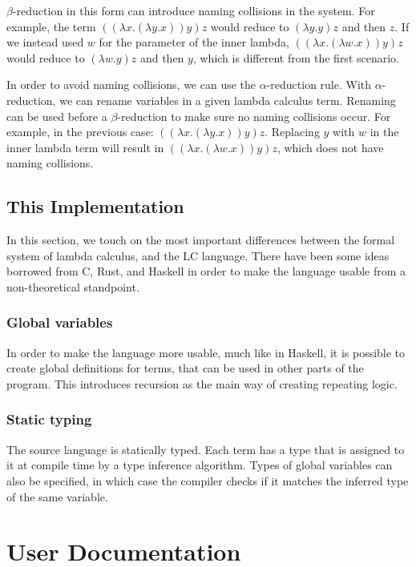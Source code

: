 \documentclass[12pt]{article}
\begin{document}
$\beta$-reduction in this form can introduce naming collisions in the system.
For example, the term $((\lambda x. (\lambda y. x)) y) z$ would reduce to
$(\lambda y. y) z$ and then $z$. If we instead used $w$ for the parameter of the
inner lambda, $((\lambda x. (\lambda w. x)) y) z$ would reduce to $(\lambda w.
y) z$ and then $y$, which is different from the first scenario.

In order to avoid naming collisions, we can use the $\alpha$-reduction rule.
With $\alpha$-reduction, we can rename variables in a given lambda calculus
term. Renaming can be used before a $\beta$-reduction to make sure no naming
collisions occur. For example, in the previous case: $((\lambda x. (\lambda y.
x)) y) z$. Replacing $y$ with $w$ in the inner lambda term will result in
$((\lambda x. (\lambda w. x)) y) z$, which does not have naming collisions.


\subsection{This Implementation}

In this section, we touch on the most important differences between the formal
system of lambda calculus, and the LC language. There have been some ideas
borrowed from C, Rust, and Haskell in order to make the language usable from a
non-theoretical standpoint.

\subsubsection{Global variables}

In order to make the language more usable, much like in Haskell, it is possible
to create global definitions for terms, that can be used in other parts of the
program. This introduces recursion as the main way of creating repeating logic.

\subsubsection{Static typing}

The source language is statically typed. Each term has a type that is assigned
to it at compile time by a type inference algorithm. Types of global variables
can also be specified, in which case the compiler checks if it matches the
inferred type of the same variable.

\pagebreak
\section{User Documentation}
\end{document}
